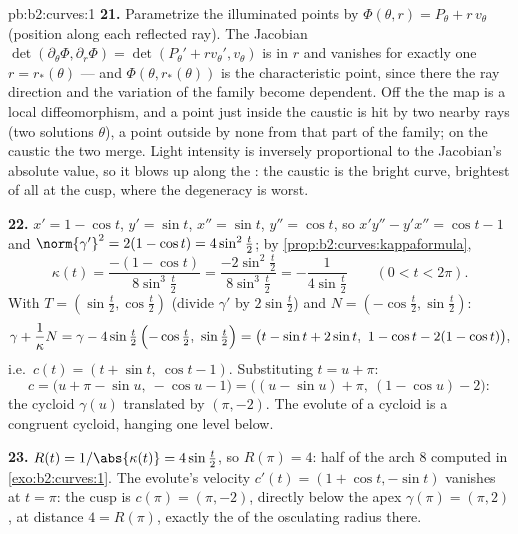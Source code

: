\begin{solution}{pb:b2:curves:1}
\textbf{21.} Parametrize the illuminated points by
$\Phi(\theta, r) = P_\theta + r\,v_\theta$ (position along
each reflected ray). The Jacobian 
$\det(\partial_\theta\Phi, \partial_r\Phi) =
\det(P_\theta' + rv_\theta', v_\theta)$ is  in $r$ and
vanishes for exactly one $r = r_*(\theta)$ --- and
$\Phi(\theta, r_*(\theta))$ is the characteristic point, since
there the ray direction and the variation of the family become
dependent. Off the  the map is a local diffeomorphism,
and a point just inside the caustic is hit by two nearby rays
(two solutions $\theta$), a point outside by none from that
part of the family; on the caustic the two merge. Light
intensity is inversely proportional to the Jacobian's absolute
value, so it blows up along the : the caustic is the
bright curve, brightest of all at the cusp, where the
degeneracy is worst.

\textbf{22.} $x' = 1 - \cos t$, $y' = \sin t$, $x'' = \sin
t$, $y'' = \cos t$, so $x'y'' - y'x'' = \cos t - 1$ and
$\norm{\gamma'}^2 = 2(1 - \cos t) = 4\sin^2\tfrac t2$;
by \cref{prop:b2:curves:kappaformula},
\[
\kappa(t) = \frac{-(1 - \cos t)}{8\sin^3\tfrac t2}
= \frac{-2\sin^2\tfrac t2}{8\sin^3\tfrac t2}
= -\frac1{4\sin\tfrac t2}
\qquad (0 < t < 2\pi).
\]
With $T = (\sin\tfrac t2, \cos\tfrac t2)$ (divide $\gamma'$
by $2\sin\tfrac t2$) and $N = (-\cos\tfrac t2, \sin\tfrac
t2)$:
\[
\gamma + \frac1\kappa N
= \gamma - 4\sin\tfrac t2\,\Bigl(-\cos\tfrac t2,\
\sin\tfrac t2\Bigr)
= \bigl(t - \sin t + 2\sin t,\ 1 - \cos t - 2(1 - \cos
t)\bigr),
\]
i.e.\ $c(t) = (t + \sin t,\ \cos t - 1)$. Substituting $t = u
+ \pi$:
\[
c = \bigl(u + \pi - \sin u,\ -\cos u - 1\bigr)
= \bigl((u - \sin u) + \pi,\ (1 - \cos u) - 2\bigr) :
\]
the cycloid $\gamma(u)$ translated by $(\pi, -2)$. The
evolute of a cycloid is a congruent cycloid, hanging one
level below.

\textbf{23.} $R(t) = 1/\abs{\kappa(t)} = 4\sin\tfrac t2$, so
$R(\pi) = 4$: half of the arch  $8$ computed in
\cref{exo:b2:curves:1}. The evolute's velocity $c'(t) = (1 +
\cos t, -\sin t)$ vanishes at $t = \pi$: the cusp is $c(\pi)
= (\pi, -2)$, directly below the apex $\gamma(\pi) = (\pi,
2)$, at distance $4 = R(\pi)$, exactly the  of the
osculating radius there.


\end{solution}
